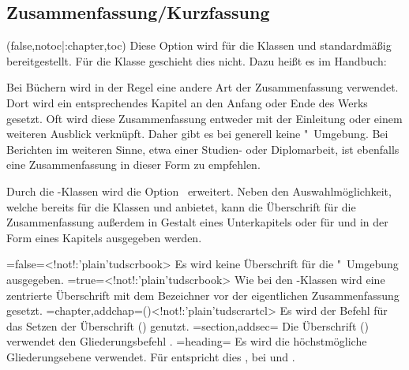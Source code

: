 \begin{DeclareEntity*}{}
\begin{DeclareEntity*}{}
\begin{DeclareEntity*}{}
\subsection{%
  Zusammenfassung/Kurzfassung%
}
%
\begin{Declaration}
  {}
  (false,notoc|:chapter,toc)
\printdeclarationlist
%
Diese Option wird für die Klassen  und  
standardmäßig bereitgestellt. Für die Klasse  geschieht dies 
nicht. Dazu heißt es im Handbuch:
%
\begin{quoting}
Bei Büchern wird in der Regel eine andere Art der Zusammenfassung verwendet. 
Dort wird ein entsprechendes Kapitel an den Anfang oder Ende des Werks gesetzt. 
Oft wird diese Zusammenfassung entweder mit der Einleitung oder einem weiteren 
Ausblick verknüpft. Daher gibt es bei  generell keine 
"~Umgebung. Bei Berichten im weiteren Sinne, etwa einer 
Studien- oder Diplomarbeit, ist ebenfalls eine Zusammenfassung in dieser Form 
zu empfehlen.
\end{quoting}
%
Durch die \TUDScript-Klassen wird die Option~ erweitert. 
Neben den Auswahlmöglichkeit, welche bereits \KOMAScript für die Klassen 
 und  anbietet, kann die Überschrift für 
die Zusammenfassung außerdem in Gestalt eines Unterkapitels oder für 
 und  in der Form eines Kapitels 
ausgegeben werden.%
%
\begin{DeclareValues}
\itemval=false=<!not!:\Class'plain'{tudscrbook}>
  Es wird keine Überschrift für die "~Umgebung ausgegeben.
\itemval*=true=<!not!:\Class'plain'{tudscrbook}>
  Wie bei den \KOMAScript-Klassen wird eine zentrierte Überschrift mit dem 
  Bezeichner  vor der eigentlichen Zusammenfassung gesetzt.
\itemval=chapter,addchap=()<!not!:\Class'plain'{tudscrartcl}>
  Es wird der Befehl  für das Setzen der Überschrift 
  () genutzt. 
\itemval=section,addsec=
  Die Überschrift () verwendet den Gliederungsbefehl 
  .
\itemval=heading=
  Es wird die höchstmögliche Gliederungsebene verwendet. Für 
   entspricht dies , bei 
   und  .
\end{DeclareValues}


\end{Declaration}
\end{DeclareEntity*}
\end{DeclareEntity*}
\end{DeclareEntity*}
